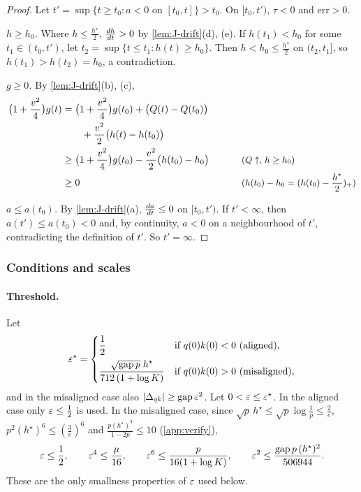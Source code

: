 \begin{proof}
Let $t'=\sup\{t\ge t_0:a<0\text{ on }[t_0,t]\}>t_0$. On $[t_0,t')$, $\tau<0$ and $\mathrm{err}>0$.

\emph{$h\ge h_0$.} Where $h\le\frac{h^\star}{2}$, $\ddt{h}>0$ by \cref{lem:J-drift}(d), (e). If $h(t_1)<h_0$ for some $t_1\in(t_0,t')$, let
$t_2=\sup\{t\le t_1:h(t)\ge h_0\}$. Then $h<h_0\le\frac{h^\star}{2}$ on $(t_2,t_1]$, so $h(t_1)>h(t_2)=h_0$, a contradiction.

\emph{$g\ge0$.} By \cref{lem:J-drift}(b), (c),
\begin{alignat*}{2}
 \bigl(1+\tfrac{v^2}{4}\bigr)g(t)&=\bigl(1+\tfrac{v^2}{4}\bigr)g(t_0)+\bigl(Q(t)-Q(t_0)\bigr) &\qquad&\\
 &\qquad+\tfrac{v^2}{2}\bigl(h(t)-h(t_0)\bigr)\\
 &\ge\bigl(1+\tfrac{v^2}{4}\bigr)g(t_0)-\tfrac{v^2}{2}\bigl(h(t_0)-h_0\bigr) && \why{$Q\uparrow$, $h\ge h_0$}\\
 &\ge0 && \why{$h(t_0)-h_0=(h(t_0)-\tfrac{h^\star}{2})_+$}
\end{alignat*}

\emph{$a\le a(t_0)$.} By \cref{lem:J-drift}(a), $\ddt{a}\le0$ on $[t_0,t')$. If $t'<\infty$, then $a(t')\le a(t_0)<0$ and, by continuity, $a<0$ on a
neighbourhood of $t'$, contradicting the definition of $t'$. So $t'=\infty$.
\end{proof}

\subsubsection{Conditions and scales}
\label{app:J-constants}

\paragraph{Threshold.} Let
\[
 \varepsilon^\star=\begin{cases}\dfrac{1}{2}&\text{if }q(0)k(0)<0\ \text{(aligned)},\\[8pt]
 \dfrac{\sqrt{\mathrm{gap}\,p}\;h^\star}{712\,(1+\log K)}&\text{if }q(0)k(0)>0\ \text{(misaligned)},\end{cases}
\]
and in the misaligned case also $|\Delta_{qk}|\ge\mathrm{gap}\,\varepsilon^2$. Let $0<\varepsilon\le\varepsilon^\star$. In the aligned case only $\varepsilon\le\frac{1}{2}$ is used.
In the misaligned case, since $\sqrt p\,h^\star\le\sqrt p\log\frac{1}{p}\le\frac{2}{e}$, $p^2(h^\star)^6\le(\frac{3}{e})^6$ and $\frac{p(h^\star)^4}{1-2p}\le10$
(\cref{app:verify}),
\begin{equation}
 \varepsilon\le\frac{1}{2},\qquad \varepsilon^4\le\frac{\mu}{16},\qquad \varepsilon^6\le\frac{p}{16(1+\log K)},\qquad
 \varepsilon^2\le\frac{\mathrm{gap}\,p\,(h^\star)^2}{506944}.
 \label{eq:J-eps}
\end{equation}
These are the only smallness properties of $\varepsilon$ used below.

